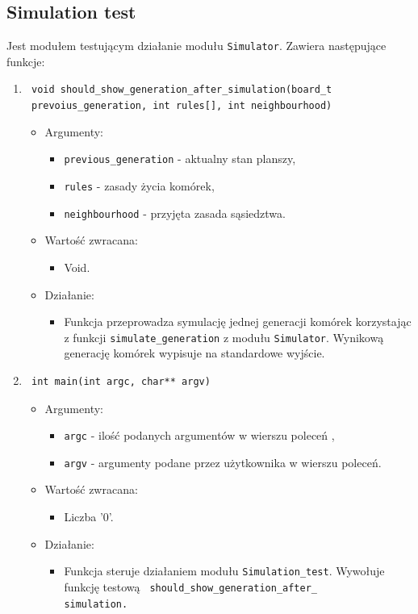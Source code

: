 \documentclass[a4paper,11pt, notitlepage ]{article}
\begin{document}
\subsection{Simulation test}
Jest modułem testującym działanie modułu \verb+Simulator+. Zawiera następujące funkcje:
\begin{enumerate}

\item \verb+ void should_show_generation_after_simulation(board_t+ \\\verb+ prevoius_generation, int rules[], int neighbourhood) +
\begin{itemize}
\item Argumenty:
\begin{itemize}
\item \verb+previous_generation+ - aktualny stan planszy,
\item \verb+rules+ - zasady życia komórek,
\item \verb+neighbourhood+ - przyjęta zasada sąsiedztwa.
\end{itemize}
\item Wartość zwracana:
\begin{itemize}
\item Void.
\end{itemize}
\item Działanie:
\begin{itemize}
\item Funkcja przeprowadza symulację jednej generacji komórek korzystając z funkcji \verb+simulate_generation+ z modułu \verb+Simulator+. Wynikową generację komórek wypisuje na standardowe wyjście.
\end{itemize}
\end{itemize}



\item \begin{verbatim} int main(int argc, char** argv) \end{verbatim}
\begin{itemize}
\item Argumenty:
\begin{itemize}
\item \verb+argc+ - ilość podanych argumentów w wierszu poleceń ,
\item \verb+argv+ - argumenty podane przez użytkownika w wierszu poleceń.
\end{itemize}
\item Wartość zwracana:
\begin{itemize}
\item Liczba '0'.
\end{itemize}
\item Działanie:
\begin{itemize}
\item Funkcja steruje działaniem modułu \verb+Simulation_test+. Wywołuje funkcję testową 
\verb+ should_show_generation_after_+\\\verb+simulation.+
\end{itemize}
\end{itemize}


\end{enumerate}
\end{document}
